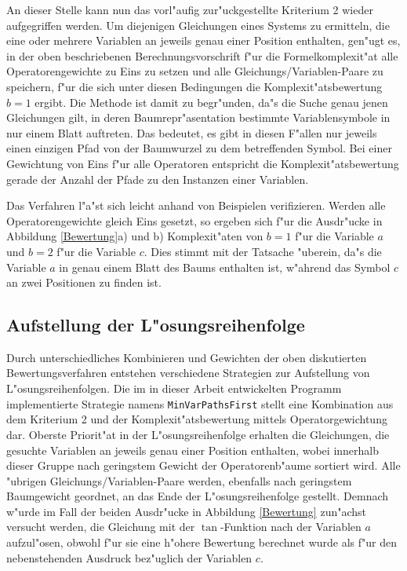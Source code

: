 An dieser Stelle kann nun das vorl"aufig zur"uckgestellte Kriterium 2
wieder aufgegriffen werden. Um diejenigen Gleichungen eines Systems zu 
ermitteln, die eine oder mehrere Variablen an jeweils genau einer
Position enthalten, gen"ugt es, in der oben beschriebenen
Berechnungsvorschrift f"ur die Formelkomplexit"at alle
Operatorengewichte zu Eins zu setzen und alle
Gleichungs/Variablen-Paare zu speichern, f"ur die sich unter diesen
Bedingungen die Komplexit"atsbewertung $b=1$ ergibt. Die Methode ist 
damit zu begr"unden, da"s die Suche genau jenen Gleichungen gilt, in 
deren Baumrepr"asentation bestimmte Variablensymbole in nur einem Blatt 
auftreten. Das bedeutet, es gibt in diesen F"allen nur jeweils einen 
einzigen Pfad von der Baumwurzel zu dem betreffenden Symbol. Bei einer 
Gewichtung von Eins f"ur alle Operatoren entspricht die 
Komplexit"atsbewertung gerade der Anzahl der Pfade zu den Instanzen 
einer Variablen.

Das Verfahren l"a"st sich leicht anhand von Beispielen verifizieren.
Werden alle Operatorengewichte gleich Eins gesetzt, so ergeben sich f"ur
die Ausdr"ucke in Abbildung \ref{Bewertung}a) und b) Komplexit"aten von
$b=1$ f"ur die Variable $a$ und $b=2$ f"ur die Variable $c$. Dies stimmt
mit der Tatsache "uberein, da"s die Variable $a$ in genau einem Blatt
des Baums enthalten ist, w"ahrend das Symbol $c$ an zwei Positionen zu
finden ist.

\subsection{Aufstellung der L"osungsreihenfolge}

Durch unterschiedliches Kombinieren und Gewichten der oben diskutierten 
Bewertungsverfahren entstehen verschiedene Strategien zur Aufstellung 
von L"osungsreihenfolgen. Die im in dieser Arbeit entwickelten Programm 
implementierte Strategie namens \verb+MinVarPathsFirst+ stellt eine
Kombination aus dem Kriterium 2 und der Komplexit"atsbewertung mittels
Operatorgewichtung dar. Oberste Priorit"at in der L"osungsreihenfolge
erhalten die Gleichungen, die gesuchte Variablen an jeweils genau einer
Position enthalten, wobei innerhalb dieser Gruppe nach geringstem
Gewicht der Operatorenb"aume sortiert wird. Alle "ubrigen 
Gleichungs/Variablen-Paare werden, ebenfalls nach geringstem Baumgewicht 
geordnet, an das Ende der L"osungsreihenfolge gestellt. Demnach w"urde 
im Fall der beiden Ausdr"ucke in Abbildung \ref{Bewertung} zun"achst 
versucht werden, die Gleichung mit der $\tan$-Funktion nach der 
Variablen $a$ aufzul"osen, obwohl f"ur sie eine h"ohere Bewertung 
berechnet wurde als f"ur den nebenstehenden Ausdruck bez"uglich der 
Variablen $c$.
